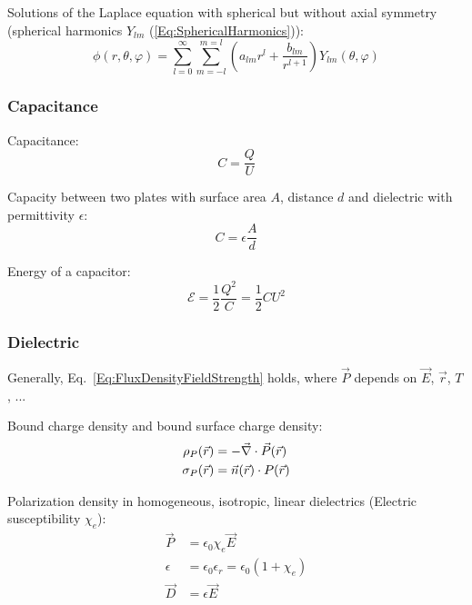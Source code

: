 			\noindent
			Solutions of the Laplace equation with spherical but without axial symmetry (spherical harmonics $Y_{lm}$ (\ref{Eq:SphericalHarmonics})):
			\begin{equation}
				\phi(r,\theta,\varphi) = \sum_{l=0}^{\infty}\sum_{m=-l}^{m=l} \left(a_{lm} r^l + \frac{b_{lm}}{r^{l+1}}\right) Y_{lm}(\theta, \varphi)
			\end{equation}

		\subsubsection{Capacitance}
			\noindent
			Capacitance:
			\begin{equation}
				C=\frac{Q}{U}
			\end{equation}

			\noindent
			Capacity between two plates with surface area $A$, distance $d$ and dielectric with permittivity  $\epsilon$:
			\begin{equation}
				C=\epsilon \frac{A}{d}
			\end{equation}

			\noindent
			Energy of a capacitor:
			\begin{equation}
				\mathcal{E} = \frac{1}{2}\frac{Q^2}{C} = \frac{1}{2}CU^2
			\end{equation}

		\subsubsection{Dielectric}
			\noindent
			Generally, Eq.~\ref{Eq:FluxDensityFieldStrength} holds, where $\vec{P}$ depends on $\vec{E}$, $\vec{r}$, $T$, ... \vspace{10pt}

			\noindent
			Bound charge density and bound surface charge density:
			\begin{equation}
				\begin{aligned}
					\rho_P(\vec{r}) &= -\vec{\nabla} \cdot\vec{P}(\vec{r}) \\
					\sigma_P(\vec{r}) &= \vec{n}(\vec{r})\cdot P(\vec{r})
				\end{aligned}
			\end{equation}

			\noindent
			Polarization density in homogeneous, isotropic, linear dielectrics (Electric susceptibility $\chi_e$):
			\begin{equation}
				\begin{aligned}
					\vec{P} &= \epsilon_0 \chi_e \vec{E} \\
					\epsilon &= \epsilon_0 \epsilon_r = \epsilon_0(1+\chi_e) \\
					\vec{D} &= \epsilon \vec{E} \\
				\end{aligned}
			\end{equation}


